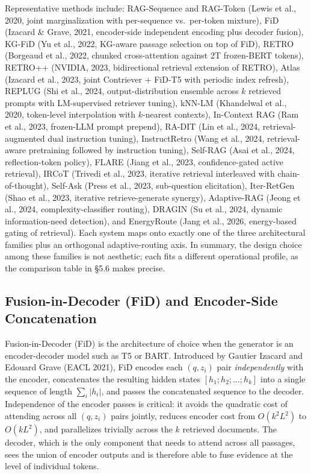 Representative methods include: RAG-Sequence and RAG-Token (Lewis et al., 2020, joint marginalization with per-sequence vs.~per-token mixture), FiD (Izacard \& Grave, 2021, encoder-side independent encoding plus decoder fusion), KG-FiD (Yu et al., 2022, KG-aware passage selection on top of FiD), RETRO (Borgeaud et al., 2022, chunked cross-attention against 2T frozen-BERT tokens), RETRO++ (NVIDIA, 2023, bidirectional retrieval extension of RETRO), Atlas (Izacard et al., 2023, joint Contriever + FiD-T5 with periodic index refresh), REPLUG (Shi et al., 2024, output-distribution ensemble across \(k\) retrieved prompts with LM-supervised retriever tuning), kNN-LM (Khandelwal et al., 2020, token-level interpolation with \(k\)-nearest contexts), In-Context RAG (Ram et al., 2023, frozen-LLM prompt prepend), RA-DIT (Lin et al., 2024, retrieval-augmented dual instruction tuning), InstructRetro (Wang et al., 2024, retrieval-aware pretraining followed by instruction tuning), Self-RAG (Asai et al., 2024, reflection-token policy), FLARE (Jiang et al., 2023, confidence-gated active retrieval), IRCoT (Trivedi et al., 2023, iterative retrieval interleaved with chain-of-thought), Self-Ask (Press et al., 2023, sub-question elicitation), Iter-RetGen (Shao et al., 2023, iterative retrieve-generate synergy), Adaptive-RAG (Jeong et al., 2024, complexity-classifier routing), DRAGIN (Su et al., 2024, dynamic information-need detection), and EnergyRoute (Jang et al., 2026, energy-based gating of retrieval). Each system maps onto exactly one of the three architectural families plus an orthogonal adaptive-routing axis. In summary, the design choice among these families is not aesthetic; each fits a different operational profile, as the comparison table in §5.6 makes precise.

\subsection{Fusion-in-Decoder (FiD) and Encoder-Side Concatenation}\label{fusion-in-decoder-fid-and-encoder-side-concatenation}

Fusion-in-Decoder (FiD) is the architecture of choice when the generator is an encoder-decoder model such as T5 or BART. Introduced by Gautier Izacard and Edouard Grave (EACL 2021), FiD encodes each \((q, z_i)\) pair \emph{independently} with the encoder, concatenates the resulting hidden states \([h_1; h_2; \dots; h_k]\) into a single sequence of length \(\sum_i |h_i|\), and passes the concatenated sequence to the decoder. Independence of the encoder passes is critical: it avoids the quadratic cost of attending across all \((q, z_i)\) pairs jointly, reduces encoder cost from \(O(k^2 L^2)\) to \(O(k L^2)\), and parallelizes trivially across the \(k\) retrieved documents. The decoder, which is the only component that needs to attend across all passages, sees the union of encoder outputs and is therefore able to fuse evidence at the level of individual tokens.

